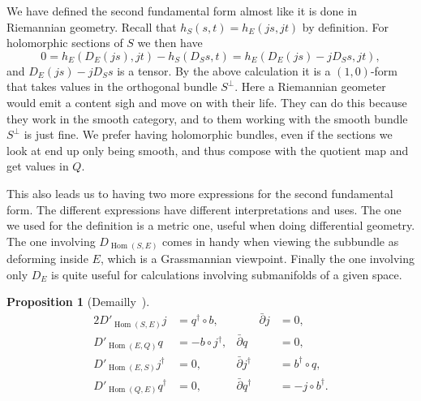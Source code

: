 \documentclass[10pt,a4paper]{article}
\newtheorem{prop}[theo]{Proposition}
\DeclareMathOperator{\Hom}{Hom}
\begin{document}
We have defined the second fundamental form almost like it is done in Riemannian geometry. Recall that $h_S(s,t) = h_E(js,jt)$ by definition. For holomorphic sections of $S$ we then have
\[
0
= h_E(D_E(js), jt) - h_S(D_Ss,t)
= h_E(D_E(js) - jD_Ss, jt),
\]
and $D_E(js) - jD_Ss$ is a tensor. By the above calculation it is a $(1,0)$-form that takes values in the orthogonal bundle $S^\perp$. Here a Riemannian geometer would emit a content sigh and move on with their life. They can do this because they work in the smooth category, and to them working with the smooth bundle $S^\perp$ is just fine. We prefer having holomorphic bundles, even if the sections we look at end up only being smooth, and thus compose with the quotient map and get values in $Q$.

This also leads us to having two more expressions for the second fundamental form. The different expressions have different interpretations and uses. The one we used for the definition is a metric one, useful when doing differential geometry. The one involving $D_{\Hom(S,E)}$ comes in handy when viewing the subbundle as deforming inside $E$, which is a Grassmannian viewpoint. Finally the one involving only $D_E$ is quite useful for calculations involving submanifolds of a given space.


\begin{prop}[Demailly~{{\cite[Theorem~14.3]{demailly-complex}}}]
\label{prop:seq-formulas}
\begin{alignat*}{2}
D'_{\Hom(S,E)}j &= q^\dagger \circ b,
&
\qquad
\bar\partial j &= 0,
\\
D'_{\Hom(E, Q)} q &= - b \circ j^\dagger,
&
\bar\partial q &= 0,
\\
D'_{\Hom(E,S)} j^\dagger &= 0,
&
\bar\partial j^\dagger &= b^\dagger \circ q,
\\
D'_{\Hom(Q,E)} q^\dagger &= 0,
&
\bar\partial q^\dagger &= - j \circ b^\dagger.
\end{alignat*}
\end{prop}
\end{document}
